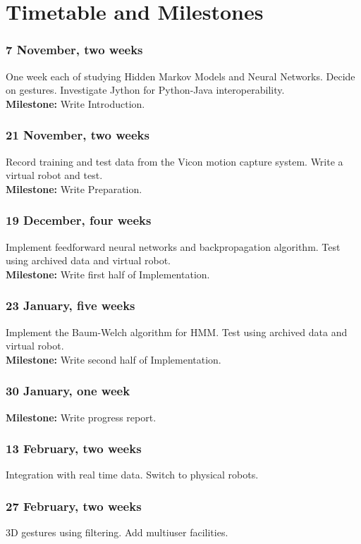 \section*{Timetable and Milestones}

\subsubsection*{7 November, two weeks}
One week each of studying Hidden Markov Models and Neural Networks.
Decide on gestures.
Investigate Jython for Python-Java interoperability.
\\{\bf Milestone:} Write Introduction.

\subsubsection*{21 November, two weeks}
Record training and test data from the Vicon motion capture system.
Write a virtual robot and test.
\\{\bf Milestone:} Write Preparation.

\subsubsection*{19 December, four weeks}
Implement feedforward neural networks and backpropagation algorithm.
Test using archived data and virtual robot.
\\{\bf Milestone:} Write first half of Implementation.

\subsubsection*{23 January, five weeks}
Implement the Baum-Welch algorithm for HMM.
Test using archived data and virtual robot.
\\{\bf Milestone:} Write second half of Implementation.

\subsubsection*{30 January, one week}
{\bf Milestone:} Write progress report.

\subsubsection*{13 February, two weeks}
Integration with real time data.
Switch to physical robots.

\subsubsection*{27 February, two weeks}
3D gestures using filtering. 
Add multiuser facilities.

